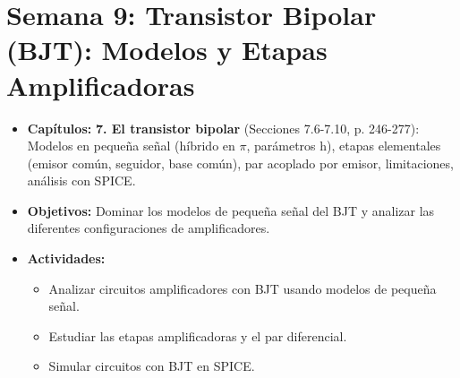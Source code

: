 \documentclass[12pt,a4paper]{article}
\begin{document}
\section{Semana 9: Transistor Bipolar (BJT): Modelos y Etapas Amplificadoras}
\begin{itemize}
    \item \textbf{Capítulos:} \textbf{7. El transistor bipolar} (Secciones 7.6-7.10, p. 246-277): Modelos en pequeña señal (híbrido en $\pi$, parámetros h), etapas elementales (emisor común, seguidor, base común), par acoplado por emisor, limitaciones, análisis con SPICE.
    \item \textbf{Objetivos:} Dominar los modelos de pequeña señal del BJT y analizar las diferentes configuraciones de amplificadores.
    \item \textbf{Actividades:}
    \begin{itemize}
        \item Analizar circuitos amplificadores con BJT usando modelos de pequeña señal.
        \item Estudiar las etapas amplificadoras y el par diferencial.
        \item Simular circuitos con BJT en SPICE.
    \end{itemize}
\end{itemize}
\end{document}
